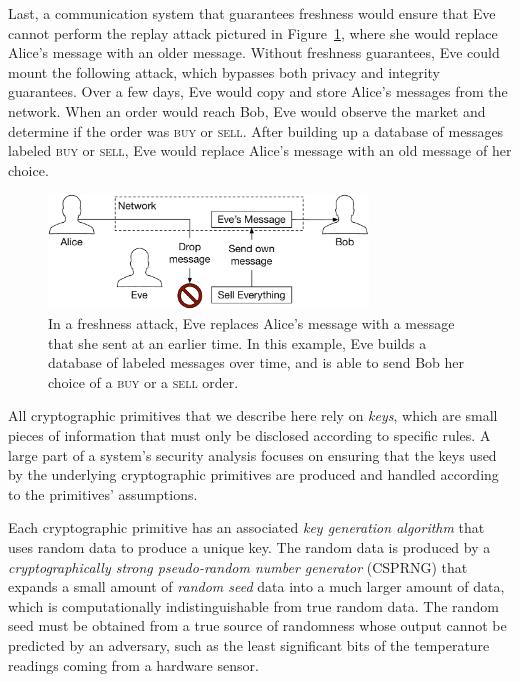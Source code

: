 Last, a communication system that guarantees freshness would ensure that Eve
cannot perform the replay attack pictured in Figure~\ref{fig:freshness_attack},
where she would replace Alice's message with an older message. Without
freshness guarantees, Eve could mount the following attack, which bypasses
both privacy and integrity guarantees. Over a few days, Eve would copy and
store Alice's messages from the network. When an order would reach Bob, Eve
would observe the market and determine if the order was \textsc{buy} or
\textsc{sell}. After building up a database of messages labeled \textsc{buy} or
\textsc{sell}, Eve would replace Alice's message with an old message of her
choice.

\begin{figure}[hbt]
  \centering
  \includegraphics[width=85mm]{figures/integrity_attack.pdf}
  \caption{
    In a freshness attack, Eve replaces Alice's message with a message that she
    sent at an earlier time. In this example, Eve builds a database of labeled
    messages over time, and is able to send Bob her choice of a \textsc{buy} or
    a \textsc{sell} order.
  }
  \label{fig:freshness_attack}
\end{figure}


\label{sec:crypto_keys}

All cryptographic primitives that we describe here rely on \textit{keys}, which
are small pieces of information that must only be disclosed according to
specific rules. A large part of a system's security analysis focuses on
ensuring that the keys used by the underlying cryptographic primitives are
produced and handled according to the primitives' assumptions.

Each cryptographic primitive has an associated \textit{key generation
algorithm} that uses random data to produce a unique key. The random data is
produced by a \textit{cryptographically strong pseudo-random number generator}
(CSPRNG) that expands a small amount of \textit{random seed} data into a much
larger amount of data, which is computationally indistinguishable from true
random data. The random seed must be obtained from a true source of randomness
whose output cannot be predicted by an adversary, such as the least significant
bits of the temperature readings coming from a hardware sensor.

